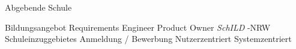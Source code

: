 Abgebende Schule

Bildungsangebot
Requirements Engineer
Product Owner
 \textit{SchILD} -NRW
Schuleinzuggebietes
Anmeldung / Bewerbung
Nutzerzentriert
Systemzentriert
